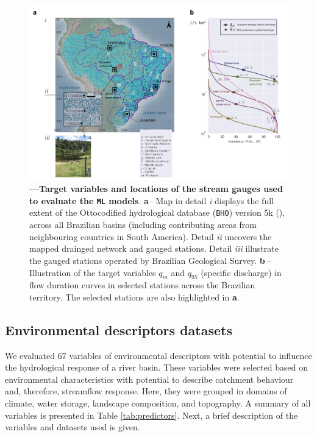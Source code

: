 \documentclass[12pt]{article}
\begin{document}
\begin{figure}[t!] %
	\centering                                       
	\includegraphics[width=0.98\linewidth]{figs/target.jpg}    
	\caption[Target variables]
	{\textbf{---\;Target variables and locations of the stream gauges used to evaluate the \texttt{ML} models}.
	\textbf{a}\,--\,Map in detail \textrm{\textit{i}} displays the full extent of the Ottocodified hydrological database (\texttt{BHO}) version 5k (\cite{ana2017}), across all Brazilian basins (including contributing areas from neighbouring countries in South America). Detail \textrm{\textit{ii}} uncovers the mapped drainged network and gauged stations. Detail \textrm{\textit{iii}} illustrate the gauged stations operated by Brazilian Geological Survey.
	\textbf{b}\,--\,Illustration of the target variables $q_{m}$ and $q_{95}$ (specific discharge) in flow duration curves in selected stations across the Brazilian territory. The selected stations are also highlighted in \textbf{a}.
	}
    \label{fig:rivers}            
\end{figure}

\subsection{Environmental descriptors datasets} \label{sec:methods:data}

\par We evaluated 67 variables of environmental descriptors with potential to influence the hydrological response of a river basin. These variables were selected based on environmental characteristics with potential to describe catchment behaviour and, therefore, streamflow response. Here, they were grouped in domains of climate, water storage, landscape composition, and topography. A summary of all variables is presented in Table \ref{tab:predictors}. Next, a brief description of the variables and datasets used is given.
\end{document}
